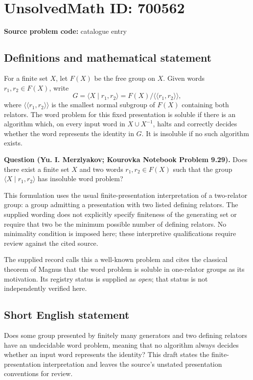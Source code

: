 \documentclass[11pt]{article}
\begin{document}
\section*{UnsolvedMath ID: 700562}
\textbf{Source problem code:} catalogue entry
\subsection{Definitions and mathematical statement}
For a finite set \(X\), let \(F(X)\) be the free group on \(X\). Given words \(r_1,r_2\in F(X)\), write
\[
G=\langle X\mid r_1,r_2\rangle
 =F(X)/\langle\!\langle r_1,r_2\rangle\!\rangle,
\]
where \(\langle\!\langle r_1,r_2\rangle\!\rangle\) is the smallest normal subgroup of \(F(X)\) containing both relators. The word problem for this fixed presentation is soluble if there is an algorithm which, on every input word in \(X\cup X^{-1}\), halts and correctly decides whether the word represents the identity in \(G\). It is insoluble if no such algorithm exists.

\textbf{Question (Yu. I. Merzlyakov; Kourovka Notebook Problem 9.29).} Does there exist a finite set \(X\) and two words \(r_1,r_2\in F(X)\) such that the group \(\langle X\mid r_1,r_2\rangle\) has insoluble word problem?

This formulation uses the usual finite-presentation interpretation of a two-relator group: a group admitting a presentation with two listed defining relators. The supplied wording does not explicitly specify finiteness of the generating set or require that two be the minimum possible number of defining relators. No minimality condition is imposed here; these interpretive qualifications require review against the cited source.

The supplied record calls this a well-known problem and cites the classical theorem of Magnus that the word problem is soluble in one-relator groups as its motivation. Its registry status is supplied as \emph{open}; that status is not independently verified here.
\subsection{Short English statement}
Does some group presented by finitely many generators and two defining relators have an undecidable word problem, meaning that no algorithm always decides whether an input word represents the identity? This draft states the finite-presentation interpretation and leaves the source's unstated presentation conventions for review.
\end{document}
